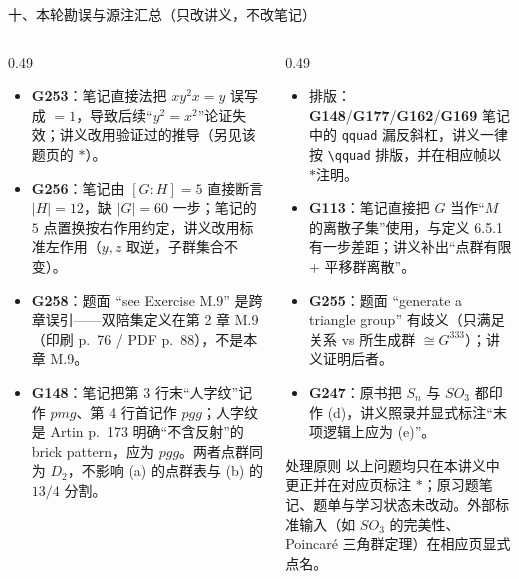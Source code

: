 \documentclass[aspectratio=169,10pt,fontset=none]{ctexbeamer}
\newcommand{\ex}[1]{\textcolor{accent}{\footnotesize\bfseries #1}}
\newcommand{\starpt}{\textcolor{accent}{\bfseries$\ast$}}
\begin{document}
\begin{frame}[t]{十、本轮勘误与源注汇总（只改讲义，不改笔记）}
  \label{sec:errata}
  \begin{columns}[T,onlytextwidth]
    \begin{column}{0.49\textwidth}
      \begin{itemize}\setlength{\itemsep}{2pt}
        \item \ex{G253}：笔记直接法把 $xy^2x=y$ 误写成 $=1$，导致后续“$y^2=x^2$”论证失效；讲义改用验证过的推导（另见该题页的 \starpt）。
        \item \ex{G256}：笔记由 $[G:H]=5$ 直接断言 $|H|=12$，缺 $|G|=60$ 一步；笔记的 $5$ 点置换按右作用约定，讲义改用标准左作用（$y,z$ 取逆，子群集合不变）。
        \item \ex{G258}：题面 “see Exercise M.9” 是跨章误引——双陪集定义在第 2 章 M.9（印刷 p.~76 / PDF p.~88），不是本章 M.9。
        \item \ex{G148}：笔记把第 3 行末“人字纹”记作 $pmg$、第 4 行首记作 $pgg$；人字纹是 Artin p.~173 明确“不含反射”的 brick pattern，应为 $pgg$。两者点群同为 $D_2$，不影响 (a) 的点群表与 (b) 的 $13/4$ 分割。
      \end{itemize}
    \end{column}
    \begin{column}{0.49\textwidth}
      \begin{itemize}\setlength{\itemsep}{2pt}
        \item 排版：\ex{G148}/\ex{G177}/\ex{G162}/\ex{G169} 笔记中的 \texttt{qquad} 漏反斜杠，讲义一律按 \texttt{\textbackslash qquad} 排版，并在相应帧以 \starpt 注明。
        \item \ex{G113}：笔记直接把 $G$ 当作“$M$ 的离散子集”使用，与定义 6.5.1 有一步差距；讲义补出“点群有限 + 平移群离散”。
        \item \ex{G255}：题面 “generate a triangle group” 有歧义（只满足关系 vs 所生成群 $\cong G^{333}$）；讲义证明后者。
        \item \ex{G247}：原书把 $S_n$ 与 $SO_3$ 都印作 (d)，讲义照录并显式标注“末项逻辑上应为 (e)”。
      \end{itemize}
      \begin{exampleblock}{\footnotesize 处理原则}
        \scriptsize
        以上问题均只在本讲义中更正并在对应页标注 \starpt；原习题笔记、题单与学习状态未改动。外部标准输入（如 $SO_3$ 的完美性、Poincaré 三角群定理）在相应页显式点名。
      \end{exampleblock}
    \end{column}
  \end{columns}
\end{frame}
\end{document}
